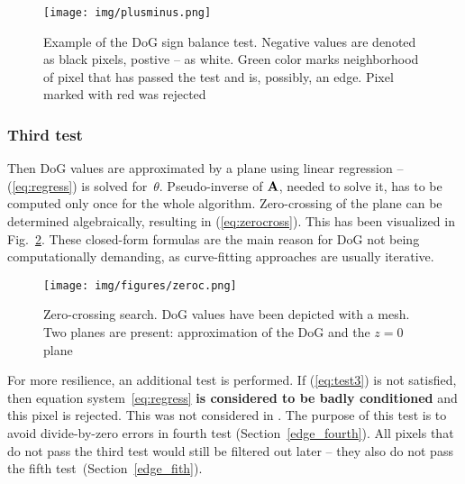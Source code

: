 \begin{figure}[ht]
	\centering\texttt{[image: img/plusminus.png]}
	\caption{ Example of the DoG sign balance test. Negative values are denoted as black pixels, postive -- as white. Green color marks neighborhood of pixel that has passed the test and is, possibly, an edge. Pixel marked with red was rejected }
	\label{fig:plusminus}
\end{figure}

\subsubsection{Third test}
\label{edge_third}

Then DoG values are approximated by a plane using linear regression -- (\ref{eq:regress}) is solved for~$\theta$. Pseudo-inverse of $\textbf{A}$, needed to solve it, has to be computed only once for the whole algorithm. Zero-crossing of the plane can be determined algebraically, resulting in (\ref{eq:zerocross}). This has been visualized in Fig.~\ref{fig:zeroc}. These closed-form formulas are the main reason for DoG not being computationally demanding, as curve-fitting approaches are usually iterative.

\begin{figure}[ht]
	\centering\texttt{[image: img/figures/zeroc.png]}
	\caption{ Zero-crossing search. DoG values have been depicted with a mesh. Two planes are present: approximation of the DoG and the $z=0$ plane }
	\label{fig:zeroc}
\end{figure}

For more resilience, an additional test is performed. If (\ref{eq:test3}) is not satisfied, then equation system~\ref{eq:regress} \textbf{is considered to be badly conditioned} and this pixel is rejected. This was not considered in \cite{jose2015realtime}. The purpose of this test is to avoid divide-by-zero errors in fourth test (Section~\ref{edge_fourth}). All pixels that do not pass the third test would still be filtered out later -- they also do not pass the fifth test~(Section~\ref{edge_fith}).


